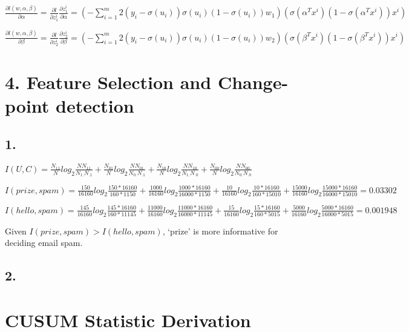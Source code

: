 \documentclass[
]{article}
\begin{document}
\(\frac{\partial l(w, \alpha, \beta)}{\partial \alpha} = \frac{\partial l}{\partial z^i_1} \frac{\partial z^i_1}{\partial \alpha} = (-\sum_{i=1}^m 2(y_i - \sigma(u_i))\sigma(u_i)(1 - \sigma(u_i))w_1)(\sigma(\alpha^Tx^i)(1 - \sigma(\alpha^Tx^i))x^i)\)

\(\frac{\partial l(w, \alpha, \beta)}{\partial \beta} = \frac{\partial l}{\partial z^i_2} \frac{\partial z^i_2}{\partial \beta} = (-\sum_{i=1}^m 2(y_i - \sigma(u_i))\sigma(u_i)(1 - \sigma(u_i))w_2)(\sigma(\beta^Tx^i)(1 - \sigma(\beta^Tx^i))x^i)\)

\hypertarget{feature-selection-and-change-point-detection}{%
\section{4. Feature Selection and Change-point
detection}\label{feature-selection-and-change-point-detection}}

\hypertarget{section-6}{%
\subsection{1.}\label{section-6}}

\(I(U,C) = \frac{N_{11}}{N}log_2\frac{NN_{11}}{N_{1.}N_{.1}} + \frac{N_{01}}{N}log_2\frac{NN_{01}}{N_{0.}N_{.1}} + \frac{N_{10}}{N}log_2\frac{NN_{10}}{N_{1.}N_{.0}} + \frac{N_{00}}{N}log_2\frac{NN_{00}}{N_{0.}N_{.0}}\)

\(I(prize,spam) = \frac{150}{16160}log_2\frac{150*16160}{160*1150} + \frac{1000}{16160}log_2\frac{1000*16160}{16000*1150} + \frac{10}{16160}log_2\frac{10*16160}{160*15010} + \frac{15000}{16160}log_2\frac{15000*16160}{16000*15010}=0.03302\)

\(I(hello,spam) = \frac{145}{16160}log_2\frac{145*16160}{160*11145} + \frac{11000}{16160}log_2\frac{11000*16160}{16000*11145} + \frac{15}{16160}log_2\frac{15*16160}{160*5015} + \frac{5000}{16160}log_2\frac{5000*16160}{16000*5015}=0.001948\)

Given \(I(prize,spam) > I(hello,spam)\), `prize' is more informative for
deciding email spam.

\hypertarget{section-7}{%
\subsection{2.}\label{section-7}}

\hypertarget{cusum-statistic-derivation}{%
\section{CUSUM Statistic Derivation}\label{cusum-statistic-derivation}}
\end{document}
